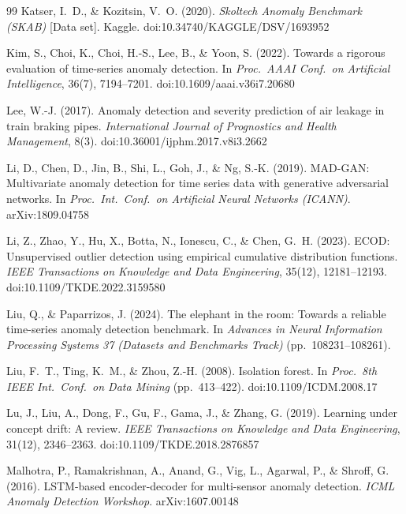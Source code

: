 \documentclass[11pt]{article}
\begin{document}
\begin{thebibliography}{99}
 Katser, I.~D., \& Kozitsin, V.~O. (2020). \emph{Skoltech Anomaly Benchmark (SKAB)} [Data set]. Kaggle. doi:10.34740/KAGGLE/DSV/1693952

 Kim, S., Choi, K., Choi, H.-S., Lee, B., \& Yoon, S. (2022). Towards a rigorous evaluation of time-series anomaly detection. In \emph{Proc.\ AAAI Conf.\ on Artificial Intelligence}, 36(7), 7194--7201. doi:10.1609/aaai.v36i7.20680

 Lee, W.-J. (2017). Anomaly detection and severity prediction of air leakage in train braking pipes. \emph{International Journal of Prognostics and Health Management}, 8(3). doi:10.36001/ijphm.2017.v8i3.2662

 Li, D., Chen, D., Jin, B., Shi, L., Goh, J., \& Ng, S.-K. (2019). MAD-GAN: Multivariate anomaly detection for time series data with generative adversarial networks. In \emph{Proc.\ Int.\ Conf.\ on Artificial Neural Networks (ICANN)}. arXiv:1809.04758

 Li, Z., Zhao, Y., Hu, X., Botta, N., Ionescu, C., \& Chen, G.~H. (2023). ECOD: Unsupervised outlier detection using empirical cumulative distribution functions. \emph{IEEE Transactions on Knowledge and Data Engineering}, 35(12), 12181--12193. doi:10.1109/TKDE.2022.3159580

 Liu, Q., \& Paparrizos, J. (2024). The elephant in the room: Towards a reliable time-series anomaly detection benchmark. In \emph{Advances in Neural Information Processing Systems 37 (Datasets and Benchmarks Track)} (pp.\ 108231--108261).

 Liu, F.~T., Ting, K.~M., \& Zhou, Z.-H. (2008). Isolation forest. In \emph{Proc.\ 8th IEEE Int.\ Conf.\ on Data Mining} (pp.\ 413--422). doi:10.1109/ICDM.2008.17

 Lu, J., Liu, A., Dong, F., Gu, F., Gama, J., \& Zhang, G. (2019). Learning under concept drift: A review. \emph{IEEE Transactions on Knowledge and Data Engineering}, 31(12), 2346--2363. doi:10.1109/TKDE.2018.2876857

 Malhotra, P., Ramakrishnan, A., Anand, G., Vig, L., Agarwal, P., \& Shroff, G. (2016). LSTM-based encoder-decoder for multi-sensor anomaly detection. \emph{ICML Anomaly Detection Workshop}. arXiv:1607.00148


\end{thebibliography}
\end{document}
